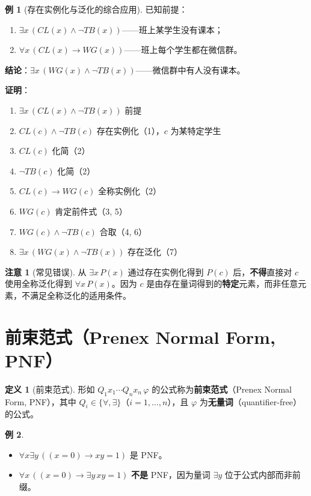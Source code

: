 \documentclass[UTF8,11pt,a4paper]{ctexbook}   %
\theoremstyle{definition}
\newtheorem{definition}{定义}[section]
\newtheorem{example}{例}[section]
\newtheorem{warning}{注意}[section]
\begin{document}
\begin{example}[存在实例化与泛化的综合应用]
已知前提：
\begin{enumerate}
    \item $\exists x\,(CL(x)\land\neg TB(x))$——班上某学生没有课本；
    \item $\forall x\,(CL(x)\to WG(x))$——班上每个学生都在微信群。
\end{enumerate}
\textbf{结论}：$\exists x\,(WG(x)\land\neg TB(x))$——微信群中有人没有课本。

\textbf{证明}：
\begin{enumerate}
    \item $\exists x\,(CL(x)\land\neg TB(x))$ \hfill 前提
    \item $CL(c)\land\neg TB(c)$ \hfill 存在实例化（1），$c$ 为某特定学生
    \item $CL(c)$ \hfill 化简（2）
    \item $\neg TB(c)$ \hfill 化简（2）
    \item $CL(c)\to WG(c)$ \hfill 全称实例化（2）
    \item $WG(c)$ \hfill 肯定前件式（3, 5）
    \item $WG(c)\land\neg TB(c)$ \hfill 合取（4, 6）
    \item $\exists x\,(WG(x)\land\neg TB(x))$ \hfill 存在泛化（7）
\end{enumerate}
\end{example}

\begin{warning}[常见错误]
从 $\exists x\,P(x)$ 通过存在实例化得到 $P(c)$ 后，\textbf{不得}直接对 $c$ 使用全称泛化得到 $\forall x\,P(x)$。因为 $c$ 是由存在量词得到的\textbf{特定}元素，而非任意元素，不满足全称泛化的适用条件。
\end{warning}

\section{前束范式（Prenex Normal Form, PNF）}

\begin{definition}[前束范式]
形如 $Q_1x_1\cdots Q_nx_n\,\varphi$ 的公式称为\textbf{前束范式}（Prenex Normal Form, PNF），其中 $Q_i\in\{\forall,\exists\}$（$i=1,\dots,n$），且 $\varphi$ 为\textbf{无量词}（quantifier-free）的公式。
\end{definition}

\begin{example}
\begin{itemize}
    \item $\forall x\exists y\,((x=0)\to xy=1)$ 是 PNF。
    \item $\forall x\,((x=0)\to\exists y\,xy=1)$ \textbf{不是} PNF，因为量词 $\exists y$ 位于公式内部而非前缀。
\end{itemize}
\end{example}
\end{document}
